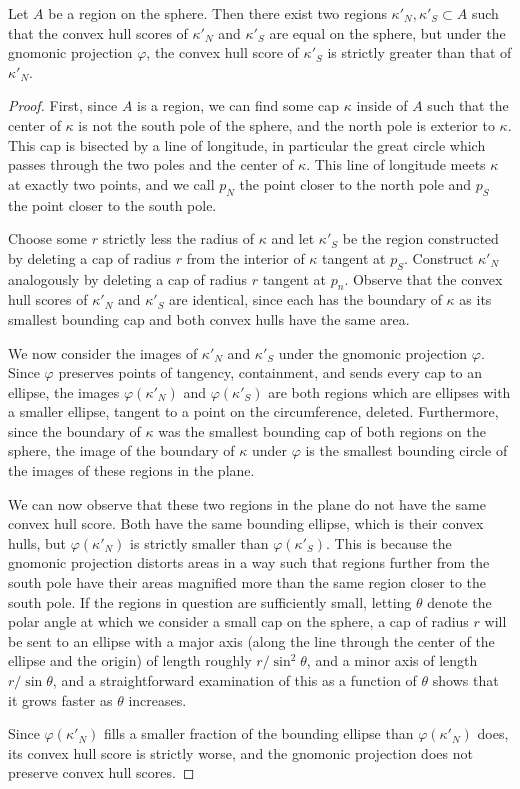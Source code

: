 \begin{theorem}
	Let $A$ be a region on the sphere.  Then there exist two regions $\kappa'_N,\kappa'_S\subset A$ such that the convex hull scores of $\kappa'_N$ and $\kappa'_S$ are equal on the sphere, but under the gnomonic projection $\varphi$, the convex hull score of $\kappa'_S$ is strictly greater than that of $\kappa'_N$. 
\end{theorem}

\begin{proof}
	First, since $A$ is a region, we can find some cap $\kappa$ inside of $A$ such that the center of $\kappa$ is not the south pole of the sphere, and the north pole is exterior to $\kappa$.  This cap is bisected by a line of longitude, in particular the great circle which passes through the two poles and the center of $\kappa$.  This line of longitude meets $\kappa$ at exactly two points, and we call $p_N$ the point closer to the north pole and $p_S$ the point closer to the south pole.
	
	Choose some $r$ strictly less the radius of $\kappa$ and let $\kappa'_S$ be the region constructed by deleting a cap of radius $r$ from the interior of $\kappa$ tangent at $p_S$.  Construct $\kappa'_N$ analogously by deleting a cap of radius $r$ tangent at $p_n$. Observe that the convex hull scores of $\kappa'_N$ and $\kappa'_S$ are identical, since each has the boundary of $\kappa$ as its smallest bounding cap and both convex hulls have the same area.
	
	We now consider the images of $\kappa'_N$ and $\kappa'_S$ under the gnomonic projection $\varphi$.  Since $\varphi$ preserves points of tangency, containment, and sends every cap to an ellipse, the images $\varphi(\kappa'_N)$ and $\varphi(\kappa'_S)$ are both regions which are ellipses with a smaller ellipse, tangent to a point on the circumference, deleted.  Furthermore, since the boundary of $\kappa$ was the smallest bounding cap of both regions on the sphere, the image of the boundary of $\kappa$ under $\varphi$ is the smallest bounding circle of the images of these regions in the plane.
	
	We can now observe that these two regions in the plane do not have the same convex hull score.  Both have the same bounding ellipse, which is their convex hulls, but $\varphi(\kappa'_N)$ is strictly smaller than $\varphi(\kappa'_S)$.  This is because the gnomonic projection distorts areas in a way such that regions further from the south pole have their areas magnified more than the same region closer to the south pole.  If the regions in question are sufficiently small, letting $\theta$ denote the polar angle at which we consider a small cap on the sphere, a cap of radius $r$ will be sent to an ellipse with a major axis (along the line through the center of the ellipse and the origin) of length roughly $r/\sin^2{\theta}$, and a minor axis of length $r/\sin{\theta}$, and a straightforward examination of this as a function of $\theta$ shows that it grows faster as $\theta$ increases.
	
	Since $\varphi(\kappa'_N)$ fills a smaller fraction of the bounding ellipse than $\varphi(\kappa'_N)$ does, its convex hull score is strictly worse, and the gnomonic projection does not preserve convex hull scores.
\end{proof}
